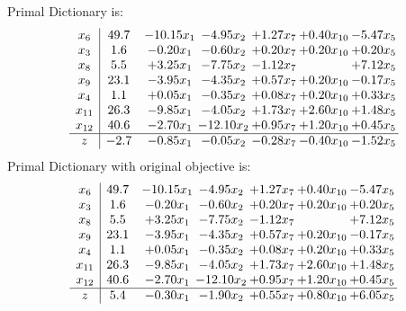\documentclass[8pt]{article}
\begin{document}
Primal Dictionary is:
\[\begin{array}{c| c c@{\hskip 2pt} c@{\hskip 2pt} c@{\hskip 2pt} c@{\hskip 2pt} c@{\hskip 2pt} }
 x_{6}   &  49.7 & -10.15 x_{1} & -4.95 x_{2} & +  1.27 x_{7} & +  0.40 x_{10} & -5.47 x_{5}\\
 x_{3}   &  1.6 & -0.20 x_{1} & -0.60 x_{2} & +  0.20 x_{7} & +  0.20 x_{10} & +  0.20 x_{5}\\
 x_{8}   &  5.5 & +  3.25 x_{1} & -7.75 x_{2} & -1.12 x_{7} &   & +  7.12 x_{5}\\
 x_{9}   &  23.1 & -3.95 x_{1} & -4.35 x_{2} & +  0.57 x_{7} & +  0.20 x_{10} & -0.17 x_{5}\\
 x_{4}   &  1.1 & +  0.05 x_{1} & -0.35 x_{2} & +  0.08 x_{7} & +  0.20 x_{10} & +  0.33 x_{5}\\
 x_{11}   &  26.3 & -9.85 x_{1} & -4.05 x_{2} & +  1.73 x_{7} & +  2.60 x_{10} & +  1.48 x_{5}\\
 x_{12}   &  40.6 & -2.70 x_{1} & -12.10 x_{2} & +  0.95 x_{7} & +  1.20 x_{10} & +  0.45 x_{5}\\
\hline
z    &  -2.7 & -0.85 x_{1} & -0.05 x_{2} & -0.28 x_{7} & -0.40 x_{10} & -1.52 x_{5}\\
\end{array}\]
Primal Dictionary with original objective is:
\[\begin{array}{c| c c@{\hskip 2pt} c@{\hskip 2pt} c@{\hskip 2pt} c@{\hskip 2pt} c@{\hskip 2pt} }
 x_{6}   &  49.7 & -10.15 x_{1} & -4.95 x_{2} & +  1.27 x_{7} & +  0.40 x_{10} & -5.47 x_{5}\\
 x_{3}   &  1.6 & -0.20 x_{1} & -0.60 x_{2} & +  0.20 x_{7} & +  0.20 x_{10} & +  0.20 x_{5}\\
 x_{8}   &  5.5 & +  3.25 x_{1} & -7.75 x_{2} & -1.12 x_{7} &   & +  7.12 x_{5}\\
 x_{9}   &  23.1 & -3.95 x_{1} & -4.35 x_{2} & +  0.57 x_{7} & +  0.20 x_{10} & -0.17 x_{5}\\
 x_{4}   &  1.1 & +  0.05 x_{1} & -0.35 x_{2} & +  0.08 x_{7} & +  0.20 x_{10} & +  0.33 x_{5}\\
 x_{11}   &  26.3 & -9.85 x_{1} & -4.05 x_{2} & +  1.73 x_{7} & +  2.60 x_{10} & +  1.48 x_{5}\\
 x_{12}   &  40.6 & -2.70 x_{1} & -12.10 x_{2} & +  0.95 x_{7} & +  1.20 x_{10} & +  0.45 x_{5}\\
\hline
z    &  5.4 & -0.30 x_{1} & -1.90 x_{2} & +  0.55 x_{7} & +  0.80 x_{10} & +  6.05 x_{5}\\
\end{array}\]
\end{document}
